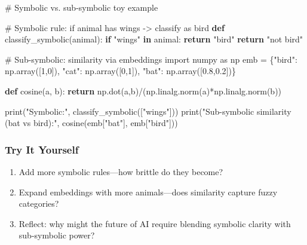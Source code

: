 \documentclass[
  letterpaper,
  DIV=11,
  numbers=noendperiod]{scrreprt}
\newenvironment{Shaded}{\begin{snugshade}}{\end{snugshade}}
\newcommand{\BuiltInTok}[1]{\textcolor[rgb]{0.00,0.23,0.31}{#1}}
\newcommand{\CommentTok}[1]{\textcolor[rgb]{0.37,0.37,0.37}{#1}}
\newcommand{\ControlFlowTok}[1]{\textcolor[rgb]{0.00,0.23,0.31}{\textbf{#1}}}
\newcommand{\DecValTok}[1]{\textcolor[rgb]{0.68,0.00,0.00}{#1}}
\newcommand{\FloatTok}[1]{\textcolor[rgb]{0.68,0.00,0.00}{#1}}
\newcommand{\ImportTok}[1]{\textcolor[rgb]{0.00,0.46,0.62}{#1}}
\newcommand{\KeywordTok}[1]{\textcolor[rgb]{0.00,0.23,0.31}{\textbf{#1}}}
\newcommand{\NormalTok}[1]{\textcolor[rgb]{0.00,0.23,0.31}{#1}}
\newcommand{\OperatorTok}[1]{\textcolor[rgb]{0.37,0.37,0.37}{#1}}
\newcommand{\StringTok}[1]{\textcolor[rgb]{0.13,0.47,0.30}{#1}}
\providecommand{\tightlist}{%
  \setlength{\itemsep}{0pt}\setlength{\parskip}{0pt}}
\begin{document}
\begin{Shaded}
\begin{Highlighting}[]
\CommentTok{\# Symbolic vs. sub{-}symbolic toy example}

\CommentTok{\# Symbolic rule: if animal has wings {-}\textgreater{} classify as bird}
\KeywordTok{def}\NormalTok{ classify\_symbolic(animal):}
    \ControlFlowTok{if} \StringTok{"wings"} \KeywordTok{in}\NormalTok{ animal:}
        \ControlFlowTok{return} \StringTok{"bird"}
    \ControlFlowTok{return} \StringTok{"not bird"}

\CommentTok{\# Sub{-}symbolic: similarity via embeddings}
\ImportTok{import}\NormalTok{ numpy }\ImportTok{as}\NormalTok{ np}
\NormalTok{emb }\OperatorTok{=}\NormalTok{ \{}\StringTok{"bird"}\NormalTok{: np.array([}\DecValTok{1}\NormalTok{,}\DecValTok{0}\NormalTok{]), }\StringTok{"cat"}\NormalTok{: np.array([}\DecValTok{0}\NormalTok{,}\DecValTok{1}\NormalTok{]), }\StringTok{"bat"}\NormalTok{: np.array([}\FloatTok{0.8}\NormalTok{,}\FloatTok{0.2}\NormalTok{])\}}

\KeywordTok{def}\NormalTok{ cosine(a, b):}
    \ControlFlowTok{return}\NormalTok{ np.dot(a,b)}\OperatorTok{/}\NormalTok{(np.linalg.norm(a)}\OperatorTok{*}\NormalTok{np.linalg.norm(b))}

\BuiltInTok{print}\NormalTok{(}\StringTok{"Symbolic:"}\NormalTok{, classify\_symbolic([}\StringTok{"wings"}\NormalTok{]))}
\BuiltInTok{print}\NormalTok{(}\StringTok{"Sub{-}symbolic similarity (bat vs bird):"}\NormalTok{, cosine(emb[}\StringTok{"bat"}\NormalTok{], emb[}\StringTok{"bird"}\NormalTok{]))}
\end{Highlighting}
\end{Shaded}

\subsubsection{Try It Yourself}\label{try-it-yourself-41}

\begin{enumerate}
\def\labelenumi{\arabic{enumi}.}
\tightlist
\item
  Add more symbolic rules---how brittle do they become?
\item
  Expand embeddings with more animals---does similarity capture fuzzy
  categories?
\item
  Reflect: why might the future of AI require blending symbolic clarity
  with sub-symbolic power?
\end{enumerate}
\end{document}
